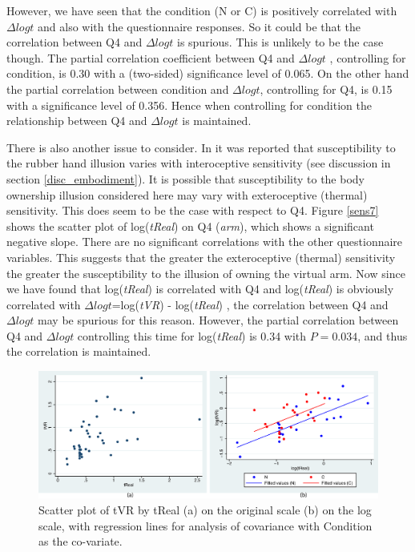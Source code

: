 \documentclass[
		twoside,openright,titlepage,numbers=noenddot,manychapters,
		headinclude,%
                footinclude=false,cleardoublepage=empty,
                BCOR=5mm,
		fontsize=11pt, %
                 enabledeprecatedfontcommands]{scrreprt}
\begin{document}
However, we have seen that the condition (N or C) is positively correlated with $\Delta log t$  and also with the questionnaire responses. So it could be that the correlation between Q4 and  $\Delta log t$  is spurious. This is unlikely to be the case though. The partial correlation coefficient between Q4 and  $\Delta log t$ , controlling for condition,  is  0.30  with a (two-sided) significance level of 0.065. On the other hand the partial correlation between condition and   $\Delta log t$, controlling for Q4, is 0.15 with a significance level of 0.356. Hence when controlling for condition the relationship between Q4 and  $\Delta log t$ is maintained. 

There is also another issue to consider. In \cite{Tsakiris2011} it was reported that susceptibility to the rubber hand illusion varies with interoceptive sensitivity (see discussion in section \ref{disc_embodiment}). It is possible that susceptibility to the body ownership illusion considered here may vary with exteroceptive (thermal) sensitivity. This does seem to be the case with respect to Q4. Figure \ref{sens7} shows the scatter plot of log(\emph{tReal}) on Q4 (\emph{arm}), which shows a significant negative slope. There are no significant correlations with the other questionnaire variables. This suggests that the greater the exteroceptive (thermal) sensitivity the greater the susceptibility to the illusion of owning the virtual arm. Now since we have found that log(\emph{tReal})  is correlated with Q4 and log(\emph{tReal})   is obviously correlated with  $\Delta log t$=log(\emph{tVR})  - log(\emph{tReal})  , the correlation between Q4 and $\Delta log t$  may be spurious for this reason. However, the partial correlation between Q4 and $\Delta log t$ controlling this time for log(\emph{tReal})  is 0.34 with $P = 0.034$, and thus the correlation is maintained.


\begin{figure}[]

\begin{center}

\includegraphics[width=12cm]{figures/sens/Figure5.eps}
\caption{Scatter plot of tVR by tReal (a) on the original scale (b) on the log scale, with regression lines for analysis of covariance with Condition as the co-variate. }
\label{sens5}

\end{center}

\end{figure} 
\end{document}
